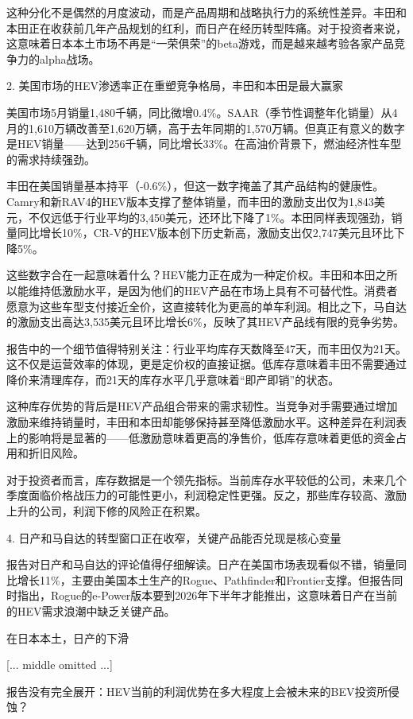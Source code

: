 \documentclass[11pt]{ctexart}
\begin{document}
这种分化不是偶然的月度波动，而是产品周期和战略执行力的系统性差异。丰田和本田正在收获前几年产品规划的红利，而日产在经历转型阵痛。对于投资者来说，这意味着日本本土市场不再是“一荣俱荣”的beta游戏，而是越来越考验各家产品竞争力的alpha战场。

2. 美国市场的HEV渗透率正在重塑竞争格局，丰田和本田是最大赢家

美国市场5月销量1,480千辆，同比微增0.4\%。SAAR（季节性调整年化销量）从4月的1,610万辆改善至1,620万辆，高于去年同期的1,570万辆。但真正有意义的数字是HEV销量——达到256千辆，同比增长33\%。在高油价背景下，燃油经济性车型的需求持续强劲。

丰田在美国销量基本持平（-0.6\%），但这一数字掩盖了其产品结构的健康性。Camry和新RAV4的HEV版本支撑了整体销量，而丰田的激励支出仅为1,843美元，不仅远低于行业平均的3,450美元，还环比下降了1\%。本田同样表现强劲，销量同比增长10\%，CR-V的HEV版本创下历史新高，激励支出仅2,747美元且环比下降5\%。

这些数字合在一起意味着什么？HEV能力正在成为一种定价权。丰田和本田之所以能维持低激励水平，是因为他们的HEV产品在市场上具有不可替代性。消费者愿意为这些车型支付接近全价，这直接转化为更高的单车利润。相比之下，马自达的激励支出高达3,535美元且环比增长6\%，反映了其HEV产品线有限的竞争劣势。

报告中的一个细节值得特别关注：行业平均库存天数降至47天，而丰田仅为21天。这不仅是运营效率的体现，更是定价权的直接证据。低库存意味着丰田不需要通过降价来清理库存，而21天的库存水平几乎意味着“即产即销”的状态。

这种库存优势的背后是HEV产品组合带来的需求韧性。当竞争对手需要通过增加激励来维持销量时，丰田和本田却能够保持甚至降低激励水平。这种差异在利润表上的影响将是显著的——低激励意味着更高的净售价，低库存意味着更低的资金占用和折旧风险。

对于投资者而言，库存数据是一个领先指标。当前库存水平较低的公司，未来几个季度面临价格战压力的可能性更小，利润稳定性更强。反之，那些库存较高、激励上升的公司，利润下修的风险正在积累。

4. 日产和马自达的转型窗口正在收窄，关键产品能否兑现是核心变量

报告对日产和马自达的评论值得仔细解读。日产在美国市场表现看似不错，销量同比增长11\%，主要由美国本土生产的Rogue、Pathfinder和Frontier支撑。但报告同时指出，Rogue的e-Power版本要到2026年下半年才能推出，这意味着日产在当前的HEV需求浪潮中缺乏关键产品。

在日本本土，日产的下滑

[... middle omitted ...]

报告没有完全展开：HEV当前的利润优势在多大程度上会被未来的BEV投资所侵蚀？
\end{document}
